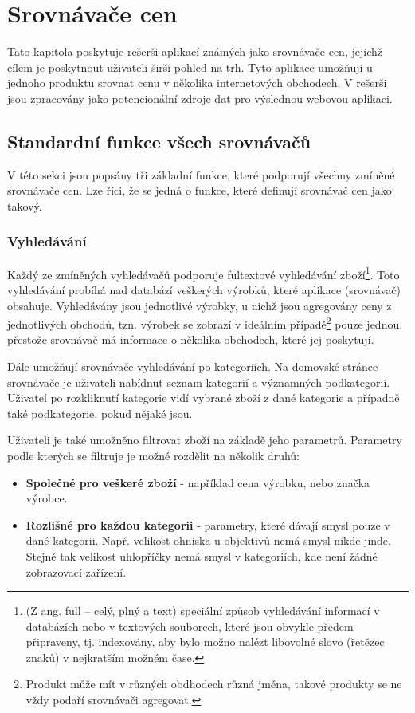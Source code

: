 \section{Srovnávače cen}
\label{sec:srovnavace-cen}
Tato kapitola poskytuje rešerši aplikací známých jako srovnávače cen, jejichž cílem je poskytnout uživateli širší pohled na trh. Tyto aplikace umožňují u jednoho produktu srovnat cenu v několika internetových obchodech. V rešerši jsou zpracovány jako potencionální zdroje dat pro výslednou webovou aplikaci.

\subsection{Standardní funkce všech srovnávačů}
V této sekci jsou popsány tři základní funkce, které podporují všechny zmíněné srovnávače cen. Lze říci, že se jedná o funkce, které definují srovnávač cen jako takový.

\subsubsection{Vyhledávání}
Každý ze zmíněných vyhledávačů podporuje fultextové vyhledávání zboží\footnote{(Z ang. full – celý, plný a text) speciální způsob vyhledávání informací v databázích nebo v textových souborech, které jsou obvykle předem připraveny, tj. indexovány, aby bylo možno nalézt libovolné slovo (řetězec znaků) v nejkratším možném čase.}. Toto vyhledávání probíhá nad databází veškerých výrobků, které aplikace (srovnávač) obsahuje. Vyhledávány jsou jednotlivé výrobky, u nichž jsou agregovány ceny z jednotlivých obchodů, tzn. výrobek se zobrazí v ideálním případě\footnote{Produkt může mít v různých obdhodech různá jména, takové produkty se ne vždy podaří srovnávači agregovat.} pouze jednou, přestože srovnávač má informace o několika obchodech, které jej poskytují.

Dále umožňují srovnávače vyhledávání po kategoriích. Na domovské stránce srovnávače je uživateli nabídnut seznam kategorií a významných podkategorií. Uživatel po rozkliknutí kategorie vidí vybrané zboží z dané kategorie a případně také podkategorie, pokud nějaké jsou.

Uživateli je také umožněno filtrovat zboží na základě jeho parametrů. Parametry podle kterých se filtruje je možné rozdělit na několik druhů:
\begin{itemize}
\item \textbf{Společné pro veškeré zboží} - například cena výrobku, nebo značka výrobce.
\item \textbf{Rozlišné pro každou kategorii} - parametry, které dávají smysl pouze v dané kategorii. Např. velikost ohniska u objektivů nemá smysl nikde jinde. Stejně tak velikost uhlopříčky nemá smysl v kategoriích, kde není žádné zobrazovací zařízení.
\end{itemize}

